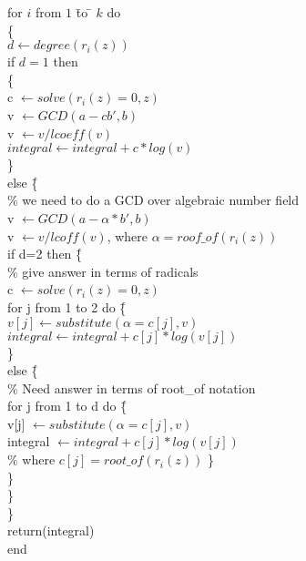\begin{tabbing}
for $i$ from $1$ \= to \= $k$  do   \\
\> \{ \\
\> \> $ d  \leftarrow degree(r_{i}(z))$ \\
\> \> if $d=1$ then \= \\
\> \> \> \{ \\
\> \> \> c $\leftarrow solve(r_{i}(z)=0,z)$ \\
\> \> \> v $\leftarrow GCD(a-cb',b)$\\
\> \> \> v $\leftarrow v/lcoeff(v) $\\

\> \> \> $integral \leftarrow integral+c*log(v)$ \\
\> \> \> \}\\

\> \> else \= \{ \\
\> \> \> \%  we need to do a GCD over algebraic number field\\
\> \> \> v $\leftarrow GCD(a-\alpha*b',b)  $ \\
\> \> \> v $\leftarrow v/lcoff(v) $, \hspace{3 mm}
 where $\alpha=roof\_of(r_{i}(z)) $\\ 
\> \> if d=2 then \= \{ \\
\> \> \> \% give answer in terms of radicals  \\
\> \> \> c $\leftarrow solve(r_{i}(z)=0,z) $ \\
\> \> \> for j from 1 to 2 do \= \{ \\
\> \> \> $v[j] \leftarrow substitute(\alpha=c[j],v) $ \\
\> \> \> $integral \leftarrow integral+c[j]*log(v[j]) $ \\
\> \> \> \} \\
\> \> \> else \= \{ \\
\> \> \> \% Need answer in terms of root\_of notation \\
\> \> \> for j from 1 to d do \= \{ \\
\> \> \>  v[j] $\leftarrow substitute(\alpha=c[j],v) $ \\
\> \> \> integral $ \leftarrow integral+c[j]*log(v[j]) $ \\
\> \> \> \% where $c[j]=root\_of(r_{i}(z))$ \} \\
\> \> \> \} \\
\> \> \} \\
\> \} \\
return(integral) \\
end
\end{tabbing}
\pagebreak
